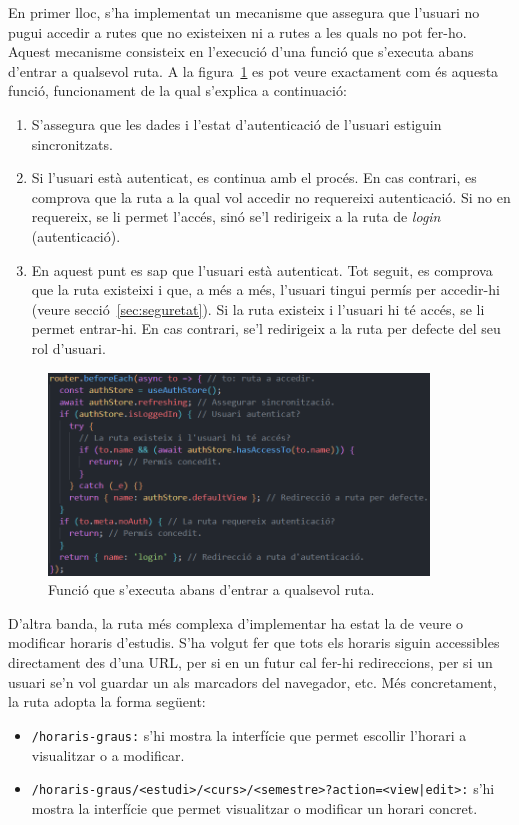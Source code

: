 \documentclass[a4paper,12pt]{ThesisStyle}
\begin{document}
En primer lloc, s'ha implementat un mecanisme que assegura que l'usuari no pugui accedir a rutes que no existeixen ni a rutes a les quals no pot fer-ho. Aquest mecanisme consisteix en l'execució d'una funció que s'executa abans d'entrar a qualsevol ruta. A la figura~\ref{img:beforeEach} es pot veure exactament com és aquesta funció, funcionament de la qual s'explica a continuació:
\begin{enumerate}
  \item S'assegura que les dades i l'estat d'autenticació de l'usuari estiguin sincronitzats.
  \item Si l'usuari està autenticat, es continua amb el procés. En cas contrari, es comprova que la ruta a la qual vol accedir no requereixi autenticació. Si no en requereix, se li permet l'accés, sinó se'l redirigeix a la ruta de \textit{login} (autenticació).
  \item En aquest punt es sap que l'usuari està autenticat. Tot seguit, es comprova que la ruta existeixi i que, a més a més, l'usuari tingui permís per accedir-hi (veure secció~\ref{sec:seguretat}). Si la ruta existeix i l'usuari hi té accés, se li permet entrar-hi. En cas contrari, se'l redirigeix a la ruta per defecte del seu rol d'usuari.
\end{enumerate}

\begin{figure}[H]
  \centering
  \includegraphics[width=0.9\textwidth]{assets/code/enrutamentClient/beforeEach.png}
  \caption{\label{img:beforeEach} Funció que s'executa abans d'entrar a qualsevol ruta.}
\end{figure}

D'altra banda, la ruta més complexa d'implementar ha estat la de veure o modificar horaris d'estudis. S'ha volgut fer que tots els horaris siguin accessibles directament des d'una URL, per si en un futur cal fer-hi redireccions, per si un usuari se'n vol guardar un als marcadors del navegador, etc. Més concretament, la ruta adopta la forma següent:
\begin{itemize}
  \item \texttt{/horaris-graus:} s'hi mostra la interfície que permet escollir l'horari a visualitzar o a modificar.
  \item \texttt{/horaris-graus/<estudi>/<curs>/<semestre>?action=<view|edit>:} s'hi mostra la interfície que permet visualitzar o modificar un horari concret.
\end{itemize}
\end{document}
